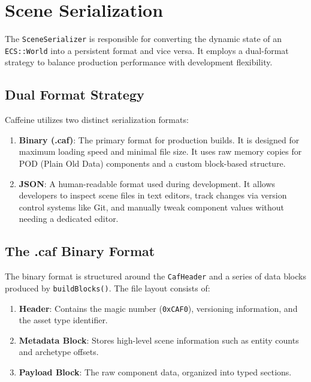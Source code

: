 
\section{Scene Serialization}

The \texttt{SceneSerializer} is responsible for converting the dynamic state of an \texttt{ECS::World} into a persistent format and vice versa. It employs a dual-format strategy to balance production performance with development flexibility.

\subsection{Dual Format Strategy}

Caffeine utilizes two distinct serialization formats:

\begin{enumerate}
    \item \textbf{Binary (.caf)}: The primary format for production builds. It is designed for maximum loading speed and minimal file size. It uses raw memory copies for POD (Plain Old Data) components and a custom block-based structure.
    \item \textbf{JSON}: A human-readable format used during development. It allows developers to inspect scene files in text editors, track changes via version control systems like Git, and manually tweak component values without needing a dedicated editor.
\end{enumerate}

\subsection{The .caf Binary Format}

The binary format is structured around the \texttt{CafHeader} and a series of data blocks produced by \texttt{buildBlocks()}. The file layout consists of:

\begin{enumerate}
    \item \textbf{Header}: Contains the magic number (\texttt{0xCAF0}), versioning information, and the asset type identifier.
    \item \textbf{Metadata Block}: Stores high-level scene information such as entity counts and archetype offsets.
    \item \textbf{Payload Block}: The raw component data, organized into typed sections.
\end{enumerate}

